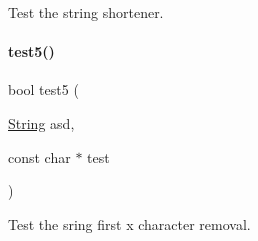 Test the string shortener. 

\mbox{\label{atest_8h_a07323edca3eb4730f312846bd8714d4a}} 
\paragraph{\texorpdfstring{test5()}{test5()}}
{\footnotesize\ttfamily bool test5 (\begin{DoxyParamCaption}\item[{\mbox{\hyperlink{class_string}{String}}}]{asd,  }\item[{const char $\ast$}]{test }\end{DoxyParamCaption})}



Test the sring first x character removal. 


